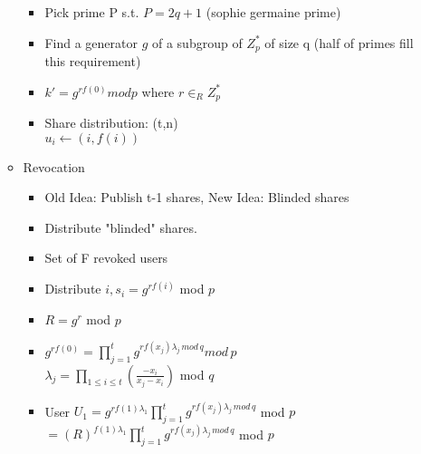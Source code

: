 \begin{itemize}
\begin{itemize}
        \begin{itemize}
        \item Pick prime P s.t. $P = 2q + 1$ (sophie germaine prime)
        \item Find a generator $g$ of a subgroup of $Z_p^*$ of size q (half of primes fill this requirement)
        \item $k' = g^{rf(0)} mod p$ where $r \in_R Z_p^*$
        \item Share distribution: (t,n)
            \\ $u_i \leftarrow (i, f(i))$
        \end{itemize}
    \item Revocation
        \begin{itemize}
        \item Old Idea: Publish t-1 shares, New Idea: Blinded shares
        \item Distribute "blinded" shares. 
        \item Set of F revoked users
        \item Distribute $i,s_i = g^{rf(i)}$ mod $p$
        \item $R = g^r$ mod $p$
        \item $g^{rf(0)} = \prod_{j=1}^t g^{rf(x_j)\lambda_j\,mod\, q} mod\,p$
            \\$\lambda_j = \prod_{1 \le i \le t}(\frac{-x_i}{x_j-x_i})$ mod $q$
        \item User $U_1 = g^{rf(1)\lambda_1} \prod_{j=1}^t g^{rf(x_j)\lambda_j\,mod\,q}$ mod $p$
            \\ $= (R)^{f(1)\lambda_1} \prod_{j=1}^t g^{rf(x_j)\lambda_j\,mod\,q}$ mod $p$
        \end{itemize}
    \end{itemize}
\end{itemize}
